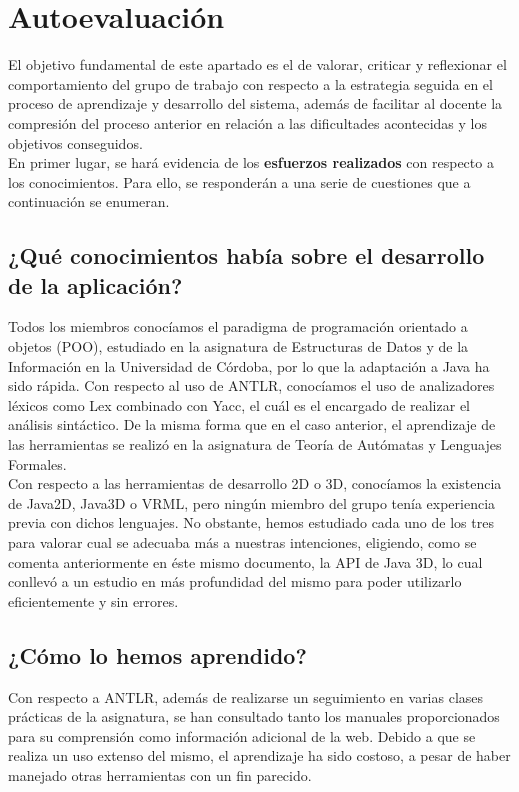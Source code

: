 \chapter{Autoevaluación}
El objetivo fundamental de este apartado es el de valorar, criticar y reflexionar el comportamiento del grupo de trabajo con 
respecto a la estrategia seguida en el proceso de aprendizaje y desarrollo del sistema, además de facilitar al docente la compresión
del proceso anterior en relación a las dificultades acontecidas y los objetivos conseguidos. \\

En primer lugar, se hará evidencia de los \textbf{esfuerzos realizados} con respecto a los conocimientos. Para ello, se responderán a 
una serie de cuestiones que a continuación se enumeran.

   \section{¿Qué conocimientos había sobre el desarrollo de la aplicación?}
   Todos los miembros conocíamos el paradigma de programación orientado a objetos (POO), estudiado en la asignatura de Estructuras de Datos y
   de la Información en la Universidad de Córdoba, por lo que la adaptación a Java ha sido rápida. Con respecto al uso de ANTLR, conocíamos
   el uso de analizadores léxicos como Lex combinado con Yacc, el cuál es el encargado de realizar el análisis sintáctico. De la misma forma
   que en el caso anterior, el aprendizaje de las herramientas se realizó en la asignatura de Teoría de Autómatas y Lenguajes Formales.\\

   Con respecto a las herramientas de desarrollo 2D o 3D, conocíamos la existencia de Java2D, Java3D o VRML, pero ningún miembro del grupo
   tenía experiencia previa con dichos lenguajes. No obstante, hemos estudiado cada uno de los tres para valorar cual se adecuaba más a nuestras
   intenciones, eligiendo, como se comenta anteriormente en éste mismo documento, la API de Java 3D, lo cual conllevó a un estudio en más 
   profundidad del mismo para poder utilizarlo eficientemente y sin errores.


   \section{¿Cómo lo hemos aprendido?}
   Con respecto a ANTLR, además de realizarse un seguimiento en varias clases prácticas de la asignatura, se han consultado tanto los
   manuales proporcionados para su comprensión como información adicional de la web. Debido a que se realiza un uso extenso del mismo,
   el aprendizaje ha sido costoso, a pesar de haber manejado otras herramientas con un fin parecido.\\

